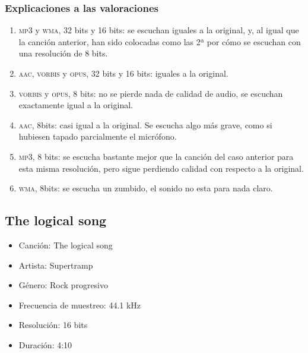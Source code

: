 \documentclass[11pt,a4paper]{article}
\begin{document}
\subsubsection{Explicaciones a las valoraciones}
\begin{enumerate}
	\item \textsc{mp3} y \textsc{wma}, 32 bits y 16 bits: se escuchan iguales a la original, y, al igual que la canción anterior, han sido colocadas como las 2ª por cómo se escuchan con una resolución de 8 bits.
	\item \textsc{aac, vorbis} y \textsc{opus}, 32 bits y 16 bits: iguales a la original.
	\item \textsc{vorbis} y \textsc{opus}, 8 bits: no se pierde nada de calidad de audio, se escuchan exactamente igual a la original.
	\item \textsc{aac}, 8bits: casi igual a la original. Se escucha algo más grave, como si hubiesen tapado parcialmente el micrófono.
	\item \textsc{mp3}, 8 bits: se escucha bastante mejor que la canción del caso anterior para esta misma resolución, pero sigue perdiendo calidad con respecto a la original.
	\item \textsc{wma}, 8bits: se escucha un zumbido, el sonido no esta para nada claro.
\end{enumerate}

\subsection{The logical song}

\begin{itemize}
	\item Canción: The logical song
	\item Artista: Supertramp
	\item Género: Rock progresivo
	\item Frecuencia de muestreo: 44.1 kHz
	\item Resolución: 16 bits
	\item Duración: 4:10
\end{itemize}
\end{document}
